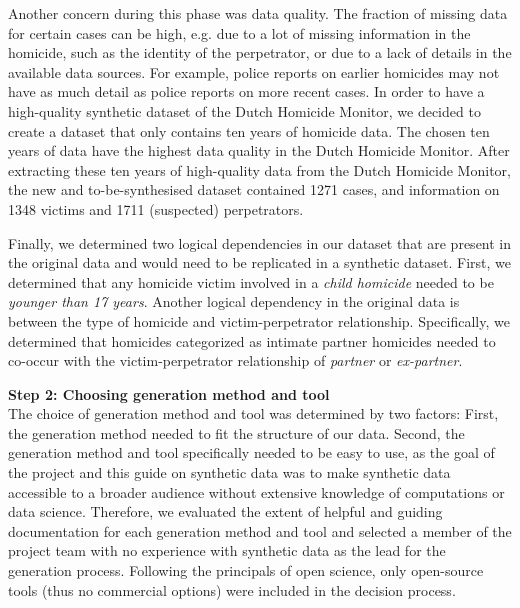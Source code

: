 Another concern during this phase was data quality. The fraction of missing data for certain cases can be high, e.g. due to a lot of missing information in the homicide, such as the identity of the perpetrator, or due to a lack of details in the available data sources. For example, police reports on earlier homicides may not have as much detail as police reports on more recent cases. In order to have a high-quality synthetic dataset of the Dutch Homicide Monitor, we decided to create a dataset that only contains ten years of homicide data. The chosen ten years of data have the highest data quality in the Dutch Homicide Monitor. After extracting these ten years of high-quality data from the Dutch Homicide Monitor, the new and to-be-synthesised dataset contained 1271 cases, and information on 1348 victims and 1711 (suspected) perpetrators. 

Finally, we determined two logical dependencies in our dataset that are present in the original data and would need to be replicated in a synthetic dataset. First, we determined that any homicide victim involved in a \textit{child homicide} needed to be \textit{younger than 17 years}. Another logical dependency in the original data is between the type of homicide and victim-perpetrator relationship. Specifically, we determined that homicides categorized as intimate partner homicides needed to co-occur with the victim-perpetrator relationship of \textit{partner} or \textit{ex-partner}.

\textbf{Step 2: Choosing generation method and tool} \\
The choice of generation method and tool was determined by two factors: First, the generation method needed to fit the structure of our data. Second, the generation method and tool specifically needed to be easy to use, as the goal of the project and this guide on synthetic data was to make synthetic data accessible to a broader audience without extensive knowledge of computations or data science. Therefore, we evaluated the extent of helpful and guiding documentation for each generation method and tool and selected a member of the project team with no experience with synthetic data as the lead for the generation process. Following the principals of open science, only open-source tools (thus no commercial options) were included in the decision process.

